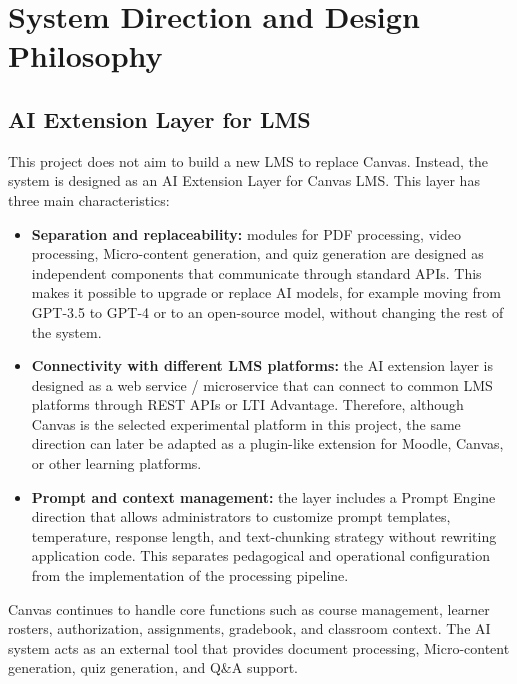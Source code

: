 \section{System Direction and Design Philosophy}

\subsection{AI Extension Layer for LMS}

This project does not aim to build a new LMS to replace Canvas. Instead, the
system is designed as an AI Extension Layer for Canvas LMS. This layer has
three main characteristics:

\begin{itemize}
    \item \textbf{Separation and replaceability:} modules for PDF
          processing, video processing, Micro-content generation, and quiz
          generation are designed as independent components that communicate
          through standard APIs. This makes it possible to upgrade or replace
          AI models, for example moving from GPT-3.5 to GPT-4 or to an
          open-source model, without changing the rest of the system.
    \item \textbf{Connectivity with different LMS platforms:} the AI
          extension layer is designed as a web service / microservice that
          can connect to common LMS platforms through REST APIs or LTI
          Advantage. Therefore, although Canvas is the selected experimental
          platform in this project, the same direction can later be adapted as
          a plugin-like extension for Moodle, Canvas, or other learning
          platforms.
    \item \textbf{Prompt and context management:} the layer includes a Prompt
          Engine direction that allows administrators to customize prompt
          templates, temperature, response length, and text-chunking strategy
          without rewriting application code. This separates pedagogical and
          operational configuration from the implementation of the processing
          pipeline.
\end{itemize}

Canvas continues to handle core functions such as course management, learner
rosters, authorization, assignments, gradebook, and classroom context. The AI
system acts as an external tool that provides document processing,
Micro-content generation, quiz generation, and Q\&A support.

